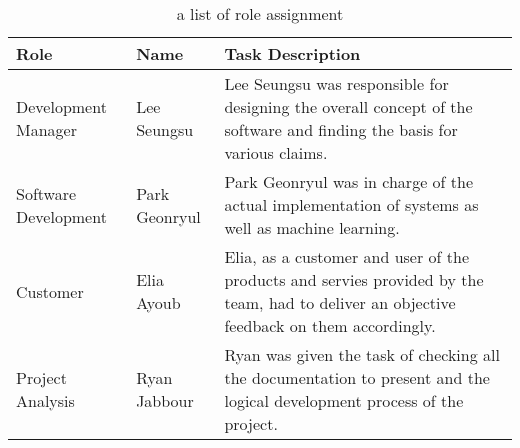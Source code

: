 \documentclass[conference]{IEEEtran}
\begin{document}
\begin{abstract}
\end{abstract}


\begin{table}[h]
    \caption{a list of role assignment}
    \begin{tabular}{|p{2.6cm}|p{1.7cm}|p{3.4cm}|}
    \hline
    Role & Name & Task Description \\ \hline
      Development Manager & Lee Seungsu & Lee Seungsu was responsible for designing the overall concept of the software and finding the basis for various claims.\\ \hline
      Software Development & Park Geonryul & Park Geonryul was in charge of the actual implementation of systems as well as machine learning.\\ \hline
      Customer & Elia Ayoub & Elia, as a customer and user of the products and servies provided by the team, had to deliver an objective feedback on them accordingly.\\ \hline
      Project Analysis & Ryan Jabbour & Ryan was given the task of checking all the documentation to present and the logical development process of the project.\\ \hline
    \end{tabular}
    \end{table}











\end{document}
